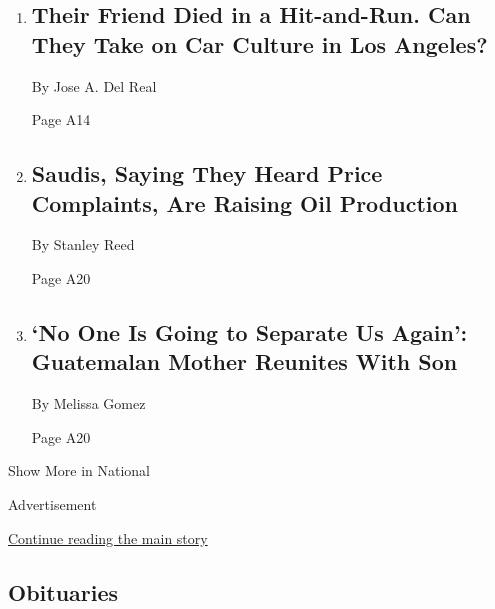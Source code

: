 \begin{enumerate}
\def\labelenumi{\arabic{enumi}.}
\item
  \href{/2018/06/23/us/los-angeles-cyclists-bikes-car-culture-collision-activism.html}{}

  \hypertarget{their-friend-died-in-a-hit-and-run-can-they-take-on-car-culture-in-los-angeles-1}{%
  \subsection{Their Friend Died in a Hit-and-Run. Can They Take on Car
  Culture in Los
  Angeles?}\label{their-friend-died-in-a-hit-and-run-can-they-take-on-car-culture-in-los-angeles-1}}

  By Jose A. Del Real

  Page A14
\item
  \href{/2018/06/23/business/opec-oil-production.html}{}

  \hypertarget{saudis-saying-they-heard-price-complaints-are-raising-oil-production-1}{%
  \subsection{Saudis, Saying They Heard Price Complaints, Are Raising
  Oil
  Production}\label{saudis-saying-they-heard-price-complaints-are-raising-oil-production-1}}

  By Stanley Reed

  Page A20
\item
  \href{/2018/06/23/us/family-reunited-border-immigration.html}{}

  \hypertarget{no-one-is-going-to-separate-us-again-guatemalan-mother-reunites-with-son}{%
  \subsection{`No One Is Going to Separate Us Again': Guatemalan Mother
  Reunites With
  Son}\label{no-one-is-going-to-separate-us-again-guatemalan-mother-reunites-with-son}}

  By Melissa Gomez

  Page A20
\end{enumerate}

Show More in National

Advertisement

\protect\hyperlink{after-mid2}{Continue reading the main story}

\hypertarget{obituaries}{%
\subsection{Obituaries}\label{obituaries}}


